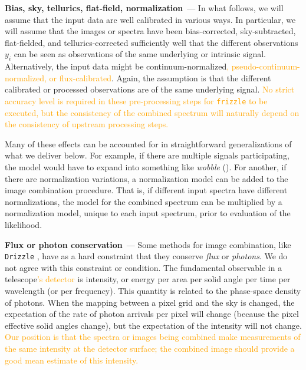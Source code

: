 \documentclass[modern, linenumbers]{aastex631}
\renewcommand{\paragraph}[1]{\medskip\par\noindent\textbf{#1}~---}
\newcommand{\modified}[1]{\textcolor{orange}{#1}}
\begin{document}
\paragraph{Bias, sky, tellurics, flat-field, normalization}
In what follows, we will assume that the input data are well calibrated in various ways.
In particular, we will assume that the images or spectra have been bias-corrected, sky-subtracted, flat-fielded, and tellurics-corrected sufficiently well that the different observations $y_i$ can be seen as observations of the same underlying or intrinsic signal.
Alternatively, the input data might be continuum-normalized\modified{, pseudo-continuum-normalized, or flux-calibrated}.
Again, the assumption is that the different calibrated or processed observations are of the same underlying signal. \modified{No strict accuracy level is required in these pre-processing steps for \texttt{frizzle} to be executed, but the consistency of the combined spectrum will naturally depend on the consistency of upstream processing steps.}

Many of these effects can be accounted for in straightforward generalizations of what we deliver below.
For example, if there are multiple signals participating, the model would have to expand into something like \textsl{wobble} (\citealt{wobble}).
For another, if there are normalization variations, a normalization model can be added to the image combination procedure.
That is, if different input spectra have different normalizations, the model for the combined spectrum can be multiplied by a normalization model, unique to each input spectrum, prior to evaluation of the likelihood.

\paragraph{Flux or photon conservation}
Some methods for image combination, like \texttt{Drizzle} \citep{drizzle}, have as a hard constraint that they conserve \emph{flux} or \emph{photons}.
We do not agree with this constraint or condition.
The fundamental observable in a telescope\modified{'s detector} is intensity, or energy per area per solid angle per time per wavelength (or per frequency).
This quantity is related to the phase-space density of photons.
When the mapping between a pixel grid and the sky is changed, the expectation of the rate of photon arrivals per pixel will change (because the pixel effective solid angles change), but the expectation of the intensity will not change.
\modified{Our position is that the spectra or images being combined make measurements of the same intensity at the detector surface; the combined image should provide a good mean estimate of this intensity.}
\end{document}
